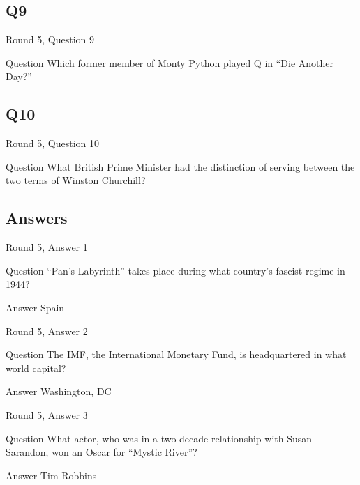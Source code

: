 \documentclass[11pt]{beamer}
\begin{document}
\subsection*{Q9}
\begin{frame}[t]{Round 5, Question 9}
\vspace{2em}
\begin{block}{Question}
Which former member of Monty Python played Q in ``Die Another Day?''
\end{block}
\end{frame}
    

\subsection*{Q10}
\begin{frame}[t]{Round 5, Question 10}
\vspace{2em}
\begin{block}{Question}
What British Prime Minister had the distinction of serving between the two terms of Winston Churchill\@?
\end{block}
\end{frame}
    
\subsection{Answers}

\begin{frame}[t]{Round 5, Answer 1}
\vspace{2em}
\begin{block}{Question}
``Pan's Labyrinth'' takes place during what country's fascist regime in 1944\@?
\end{block}
\pause{}
\begin{block}{Answer}
Spain
\end{block}
\end{frame}
    

\begin{frame}[t]{Round 5, Answer 2}
\vspace{2em}
\begin{block}{Question}
The IMF, the International Monetary Fund, is headquartered in what world capital\@?
\end{block}
\pause{}
\begin{block}{Answer}
Washington, DC
\end{block}
\end{frame}
    

\begin{frame}[t]{Round 5, Answer 3}
\vspace{2em}
\begin{block}{Question}
What actor, who was in a two-decade relationship with Susan Sarandon, won an Oscar for ``Mystic River''\@?
\end{block}
\pause{}
\begin{block}{Answer}
Tim Robbins
\end{block}
\end{frame}
    
\end{document}
